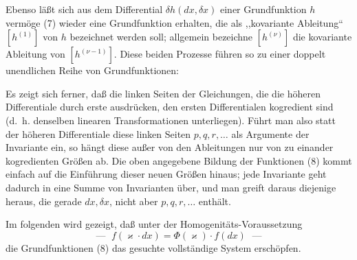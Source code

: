 Ebenso läßt sich aus dem Differential \(\delta h(dx,\delta x)\) einer
Grundfunktion \(h\) vermöge (7) wieder eine Grundfunktion erhalten, die
als ,,kovariante Ableitung`` \([h^{(1)}]\) von \(h\) bezeichnet werden
soll; allgemein bezeichne \([h^{(\nu)}]\) die kovariante Ableitung von
\([h^{(\nu-1)}]\). Diese beiden Prozesse führen so zu einer doppelt
unendlichen Reihe von Grundfunktionen:

Es zeigt sich ferner, daß die linken Seiten der Gleichungen, die die
höheren Differentiale durch erste ausdrücken, den ersten Differentialen
kogredient sind (d.~h. denselben linearen Transformationen unterliegen).
Führt man also statt der höheren Differentiale diese linken Seiten
\(p,q,r,\ldots\) als Argumente der Invariante ein, so hängt diese außer
von den Ableitungen nur von zu einander kogredienten Größen ab. Die
oben angegebene Bildung der Funktionen (8) kommt einfach auf die
Einführung dieser neuen Größen hinaus; jede Invariante geht dadurch in
eine Summe von Invarianten über, und man greift daraus diejenige heraus,
die gerade \(dx,\delta x\), nicht aber \(p,q,r,\ldots\) enthält.

Im folgenden wird gezeigt, daß unter der Homogenitäts-Voraussetzung
\[
\text{--- }\;f(\varkappa\cdot dx)=\Phi(\varkappa)\cdot f(dx)\;\text{ ---}
\]
die Grundfunktionen (8) das gesuchte vollständige System erschöpfen.


